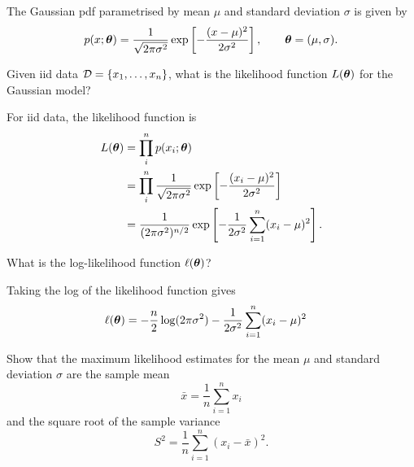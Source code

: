
\label{ex:Gauss-MLE}

  The Gaussian pdf parametrised by mean $\mu$ and standard deviation $\sigma$ is given by
  $$ p(x; \boldsymbol{\theta}) = \frac{1}{\sqrt{2\pi\sigma^2}}\exp\left[-\frac{(x-\mu)^2}{2\sigma^2}\right], \quad \quad \boldsymbol{\theta} = (\mu, \sigma).$$
  
\begin{exenumerate}
  
\item Given iid data $\mathcal{D} = \{x_1, \ldots, x_n\}$, what is the likelihood function $L(\boldsymbol{\theta})$ for the Gaussian model?
  
  \begin{solution}
    For iid data, the likelihood function is
    \begin{align}
      L(\boldsymbol{\theta}) &= \prod_i^n p(x_i;\boldsymbol{\theta}) \\
		    &= \prod_i^n \frac{1}{\sqrt{2\pi\sigma^2}}\exp\left[-\frac{(x_i-\mu)^2}{2\sigma^2}\right]\\
		    &= \frac{1}{(2\pi\sigma^2)^{n/2}}\exp\left[-\frac{1}{2\sigma^2}\sum_{i=1}^n (x_i-\mu)^2\right].
    \end{align}
    
  \end{solution}

\item What is the log-likelihood function $\ell(\boldsymbol{\theta})$?

\begin{solution}

  Taking the log of the likelihood function gives
  \begin{align}
    \ell(\boldsymbol{\theta}) & = -\frac{n}{2} \log(2\pi \sigma^2) -\frac{1}{2\sigma^2} \sum_{i=1}^n (x_i-\mu)^2
  \end{align}

\end{solution}
    
\item Show that the maximum likelihood estimates for the mean $\mu$ and standard deviation $\sigma$ are the
  sample mean 
  \begin{equation}
    \bar{x}= \frac{1}{n} \sum_{i=1}^n x_i
    \end{equation}
  and the square root of the sample variance
  \begin{equation}
    S^2 = \frac{1}{n} \sum_{i=1}^n (x_i -\bar{x})^2.
  \end{equation}
    

\end{exenumerate}
